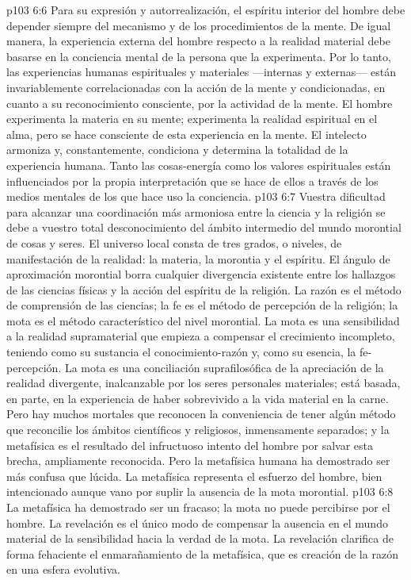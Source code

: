 \vs p103 6:6 Para su expresión y autorrealización, el espíritu interior del hombre debe depender siempre del mecanismo y de los procedimientos de la mente. De igual manera, la experiencia externa del hombre respecto a la realidad material debe basarse en la conciencia mental de la persona que la experimenta. Por lo tanto, las experiencias humanas espirituales y materiales ---internas y externas--- están invariablemente correlacionadas con la acción de la mente y condicionadas, en cuanto a su reconocimiento consciente, por la actividad de la mente. El hombre experimenta la materia en su mente; experimenta la realidad espiritual en el alma, pero se hace consciente de esta experiencia en la mente. El intelecto armoniza y, constantemente, condiciona y determina la totalidad de la experiencia humana. Tanto las cosas\hyp{}energía como los valores espirituales están influenciados por la propia interpretación que se hace de ellos a través de los medios mentales de los que hace uso la conciencia.
\vs p103 6:7 Vuestra dificultad para alcanzar una coordinación más armoniosa entre la ciencia y la religión se debe a vuestro total desconocimiento del ámbito intermedio del mundo morontial de cosas y seres. El universo local consta de tres grados, o niveles, de manifestación de la realidad: la materia, la morontia y el espíritu. El ángulo de aproximación morontial borra cualquier divergencia existente entre los hallazgos de las ciencias físicas y la acción del espíritu de la religión. La razón es el método de comprensión de las ciencias; la fe es el método de percepción de la religión; la mota es el método característico del nivel morontial. La mota es una sensibilidad a la realidad supramaterial que empieza a compensar el crecimiento incompleto, teniendo como su sustancia el conocimiento\hyp{}razón y, como su esencia, la fe\hyp{}percepción. La mota es una conciliación suprafilosófica de la apreciación de la realidad divergente, inalcanzable por los seres personales materiales; está basada, en parte, en la experiencia de haber sobrevivido a la vida material en la carne. Pero hay muchos mortales que reconocen la conveniencia de tener algún método que reconcilie los ámbitos científicos y religiosos, inmensamente separados; y la metafísica es el resultado del infructuoso intento del hombre por salvar esta brecha, ampliamente reconocida. Pero la metafísica humana ha demostrado ser más confusa que lúcida. La metafísica representa el esfuerzo del hombre, bien intencionado aunque vano por suplir la ausencia de la mota morontial.
\vs p103 6:8 \pc La metafísica ha demostrado ser un fracaso; la mota no puede percibirse por el hombre. La revelación es el único modo de compensar la ausencia en el mundo material de la sensibilidad hacia la verdad de la mota. La revelación clarifica de forma fehaciente el enmarañamiento de la metafísica, que es creación de la razón en una esfera evolutiva.
